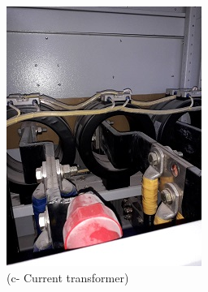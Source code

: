 \begin{figure}
\begin{minipage}[b]{0.22\linewidth}
	\end{minipage}
	\hspace{0.03cm}
	\begin{minipage}[b]{0.22\linewidth}
		\centering
		\includegraphics[width=\textwidth]{figures/R1P_visual/currenttransformer}
		\caption*{(c- Current transformer)}
	\end{minipage}
	\hspace{0.03cm}
	\begin{minipage}[b]{0.22\linewidth}
		\centering

\end{minipage}
\end{figure}
